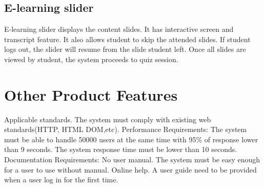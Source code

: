 \documentclass[a4paper]{article}
\begin{document}
\subsection{E-learning slider}
E-learning slider displays the content slides. It has interactive screen and transcript feature. It also allows student to skip the attended slides. If student logs out, the slider will resume from the slide student left. Once all slides are viewed by student, the system proceeds to quiz session. 
\bigskip


\section{Other Product Features}
Applicable standards. The system must comply with existing web standards(HTTP, HTML DOM,etc).
Performance Requirements:
The system must be able to handle 50000 users at the same time with 95\% of response lower than 9 seconds. 
The system response time must be lower than 10 seconds.
Documentation Requirements: 
No user manual. The system must be easy enough for a user to use without manual.
Online help. A user guide need to be provided when a user log in for the first time.
\end{document}
